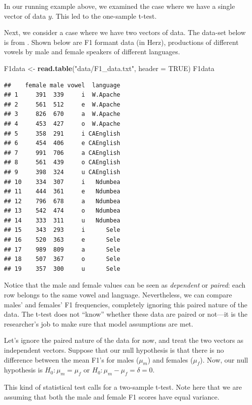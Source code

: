 \documentclass[12pt,]{krantz}
\newenvironment{Shaded}{\begin{snugshade}}{\end{snugshade}}
\newcommand{\DataTypeTok}[1]{\textcolor[rgb]{0.13,0.29,0.53}{#1}}
\newcommand{\KeywordTok}[1]{\textcolor[rgb]{0.13,0.29,0.53}{\textbf{#1}}}
\newcommand{\NormalTok}[1]{#1}
\newcommand{\OtherTok}[1]{\textcolor[rgb]{0.56,0.35,0.01}{#1}}
\newcommand{\StringTok}[1]{\textcolor[rgb]{0.31,0.60,0.02}{#1}}
\begin{document}
In our running example above, we examined the case where we have a single vector of data \(y\). This led to the one-sample t-test.

Next, we consider a case where we have two vectors of data. The data-set below is from \citet{johnson2011quantitative}. Shown below are F1 formant data (in Herz), productions of different vowels by male and female speakers of different languages.

\begin{Shaded}
\begin{Highlighting}[]
\NormalTok{F1data <-}\StringTok{ }\KeywordTok{read.table}\NormalTok{(}\StringTok{"data/F1_data.txt"}\NormalTok{, }\DataTypeTok{header =} \OtherTok{TRUE}\NormalTok{)}
\NormalTok{F1data}
\end{Highlighting}
\end{Shaded}

\begin{verbatim}
##    female male vowel  language
## 1     391  339     i  W.Apache
## 2     561  512     e  W.Apache
## 3     826  670     a  W.Apache
## 4     453  427     o  W.Apache
## 5     358  291     i CAEnglish
## 6     454  406     e CAEnglish
## 7     991  706     a CAEnglish
## 8     561  439     o CAEnglish
## 9     398  324     u CAEnglish
## 10    334  307     i   Ndumbea
## 11    444  361     e   Ndumbea
## 12    796  678     a   Ndumbea
## 13    542  474     o   Ndumbea
## 14    333  311     u   Ndumbea
## 15    343  293     i      Sele
## 16    520  363     e      Sele
## 17    989  809     a      Sele
## 18    507  367     o      Sele
## 19    357  300     u      Sele
\end{verbatim}

Notice that the male and female values can be seen as \emph{dependent} or \emph{paired}: each row belongs to the same vowel and language. Nevertheless, we can compare males' and females' F1 frequencies, completely ignoring this paired nature of the data. The t-test does not ``know'' whether these data are paired or not---it is the researcher's job to make sure that model assumptions are met.

Let's ignore the paired nature of the data for now, and treat the two vectors as independent vectors. Suppose that our null hypothesis is that there is no difference between the mean F1's for males (\(\mu_m\)) and females (\(\mu_f\)).
Now, our null hypothesis is \(H_0: \mu_m = \mu_f\) or \(H_0: \mu_m - \mu_f = \delta = 0\).

This kind of statistical test calls for a two-sample t-test. Note here that we are assuming that both the male and female F1 scores have equal variance.
\end{document}
